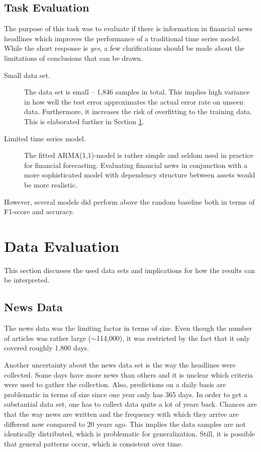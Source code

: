\subsection{Task Evaluation}

The purpose of this task was to evaluate if there is information in financial news headlines which improves the performance of a traditional time series model. While the short response is \emph{yes}, a few clarifications should be made about the limitations of conclusions that can be drawn. 

\begin{description}
    \item[Small data set.] The data set is small -- 1,846 samples in total. This implies high variance in how well the test error approximates the actual error rate on unseen data. Furthermore, it increases the risk of overfitting to the training data. This is elaborated further in Section \ref{sec:disc_data}.
    \item[Limited time series model.] The fitted ARMA(1,1)-model is rather simple and seldom used in practice for financial forecasting. Evaluating financial news in conjunction with a more sophisticated model with dependency structure between assets would be more realistic. 
\end{description}

However, several models did perform above the random baseline both in terms of F1-score and accuracy. 



\section{Data Evaluation}\label{sec:disc_data}
This section discusses the used data sets and implications for how the results can be interpreted. 

\subsection{News Data}\label{sec:news_disc}

The news data was the limiting factor in terms of size. Even though the number of articles was rather large ($\sim$114,000), it was restricted by the fact that it only covered roughly 1,800 days.

Another uncertainty about the news data set is the way the headlines were collected. Some days have more news than others and it is unclear which criteria were used to gather the collection. Also, predictions on a daily basis are problematic in terms of size since one year only has 365 days. In order to get a substantial data set, one has to collect data quite a lot of years back. Chances are that the way news are written and the frequency with which they arrive are different now compared to 20 years ago. This implies the data samples are not identically distributed, which is problematic for generalization. Still, it is possible that general patterns occur, which is consistent over time. 

